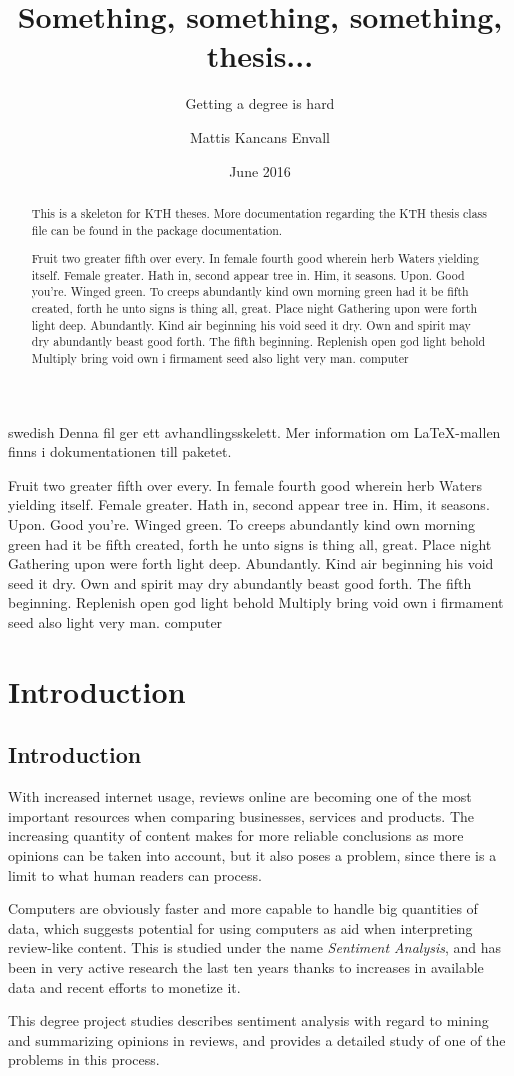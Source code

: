 \documentclass[a4paper,11pt]{kth-mag}
\title{Something, something, something, thesis...}
\subtitle{Getting a degree is hard}
\author{Mattis Kancans Envall}
\date{June 2016}
\newcommand{\loremipsum}{
  {\color{lightgray}
  Fruit two greater fifth over every. In female fourth good wherein herb
  Waters yielding itself. Female greater. Hath in, second appear tree in.
  Him, it seasons. Upon. Good you're. Winged green. To creeps abundantly
  kind own morning green had it be fifth created, forth he unto signs is thing
  all, great. Place night Gathering upon were forth light deep. Abundantly.
  Kind air beginning his void seed it dry. Own and spirit may dry abundantly
  beast good forth. The fifth beginning. Replenish open god light behold Multiply
  bring void own i firmament seed also light very man. \gls{computer}

  }
}
\begin{document}
\frontmatter
\pagestyle{empty}
\removepagenumbers
\maketitle
{}
\begin{abstract}
  This is a skeleton for KTH theses. More documentation
  regarding the KTH thesis class file can be found in
  the package documentation.

\loremipsum

\end{abstract}
\clearpage
\begin{foreignabstract}{swedish}
  Denna fil ger ett avhandlingsskelett.
  Mer information om \LaTeX-mallen finns i
  dokumentationen till paketet.

\loremipsum

\end{foreignabstract}
\clearpage
\tableofcontents*

\glsaddall
\printglossaries

\mainmatter
\pagestyle{newchap}
\part{Introduction}
\chapter{Introduction}
With increased internet usage, reviews online are becoming one of the most important resources when comparing businesses, services and products.
The increasing quantity of content makes for more reliable conclusions as more opinions can be taken into account, but it also poses a problem,
since there is a limit to what human readers can process.

Computers are obviously faster and more capable to handle big quantities of data, which suggests potential for using computers as aid when
interpreting review-like content. This is studied under the name \emph{Sentiment Analysis}, and has been in very active research the last ten years
thanks to increases in available data and recent efforts to monetize it.

This degree project studies describes sentiment analysis with regard to mining and summarizing opinions in reviews, and provides a detailed study of one of the problems in this process.

\end{document}
